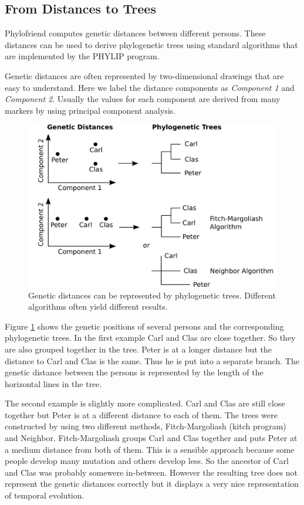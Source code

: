 \subsection{From Distances to Trees}

Phylofriend computes genetic distances between different
persons. These distances can be used to derive phylogenetic
trees using standard algorithms that are implemented by
the PHYLIP\cite{Phylip} program.

Genetic distances are often represented by two-dimensional
drawings that are easy to understand. Here we label the
distance components as \emph{Component 1} and 
\emph{Component 2}. Usually the values for each component
are derived from many markers by using principal component
analysis\cite{Shl09}.

\begin{figure}[ht]
\centering
\includegraphics[width=13cm]{img/distancetrees.png}
\caption{\label{distancetrees} Genetic distances can be
represented by phylogenetic trees. Different algorithms
often yield different results.}
\end{figure}

Figure \ref{distancetrees} shows the genetic positions of
several persons and the corresponding phylogenetic trees.
In the first example Carl and Clas are close together. So
they are also grouped together in the tree. Peter is at a
longer distance but the distance to Carl and Clas is the
same. Thus he is put into a separate branch. The genetic
distance between the persons is represented by the length
of the horizontal lines in the tree.

The second example is slightly more complicated. Carl and
Clas are still close together but Peter is at a different
distance to each of them. The trees were constructed by
using two different methods, Fitch-Margoliash (kitch program)
and Neighbor. Fitch-Margoliash groups Carl and Clas together
and puts Peter at a medium distance from both of them. This
is a sensible approach because some people develop many
mutation and others develop less. So the ancestor of Carl and
Clas was probably somewere in-between. However the resulting
tree does not represent the genetic distances correctly but
it displays a very nice representation of temporal evolution.

